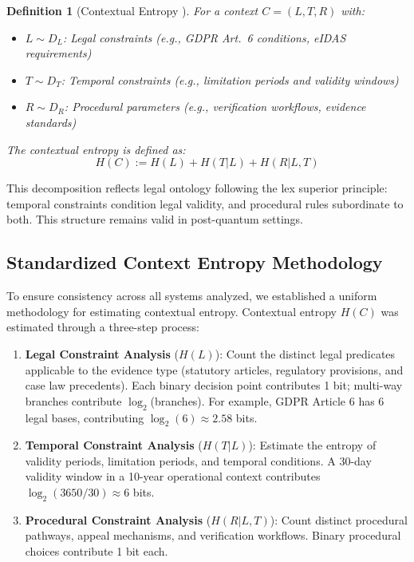 \documentclass{ieeeaccess}
\newtheorem{definition}{Definition}[section]
\begin{document}
\begin{definition}[Contextual Entropy {\cite[Section III-A]{Minka2026CRO}}]
For a context $C = (L, T, R)$ with:
\begin{itemize}
    \item $L \sim D_L$: Legal constraints (e.g., GDPR Art.\ 6 conditions, eIDAS requirements)
    \item $T \sim D_T$: Temporal constraints (e.g., limitation periods and validity windows)
    \item $R \sim D_R$: Procedural parameters (e.g., verification workflows, evidence standards)
\end{itemize}
The contextual entropy is defined as:
\begin{equation}
    H(C) := H(L) + H(T|L) + H(R|L,T)
\end{equation}
\end{definition}

This decomposition reflects legal ontology following the lex superior principle: temporal constraints condition legal validity, and procedural rules subordinate to both. This structure remains valid in post-quantum settings.

\subsection{Standardized Context Entropy Methodology}

To ensure consistency across all systems analyzed, we established a uniform methodology for estimating contextual entropy. Contextual entropy $H(C)$ was estimated through a three-step process:

\begin{enumerate}
    \item \textbf{Legal Constraint Analysis} ($H(L)$): Count the distinct legal predicates applicable to the evidence type (statutory articles, regulatory provisions, and case law precedents). Each binary decision point contributes 1 bit; multi-way branches contribute $\log_2$(branches). For example, GDPR Article 6 has 6 legal bases, contributing $\log_2(6) \approx 2.58$ bits.

    \item \textbf{Temporal Constraint Analysis} ($H(T|L)$): Estimate the entropy of validity periods, limitation periods, and temporal conditions. A 30-day validity window in a 10-year operational context contributes $\log_2(3650/30) \approx 6$ bits.

    \item \textbf{Procedural Constraint Analysis} ($H(R|L,T)$): Count distinct procedural pathways, appeal mechanisms, and verification workflows. Binary procedural choices contribute 1 bit each.
\end{enumerate}
\end{document}
